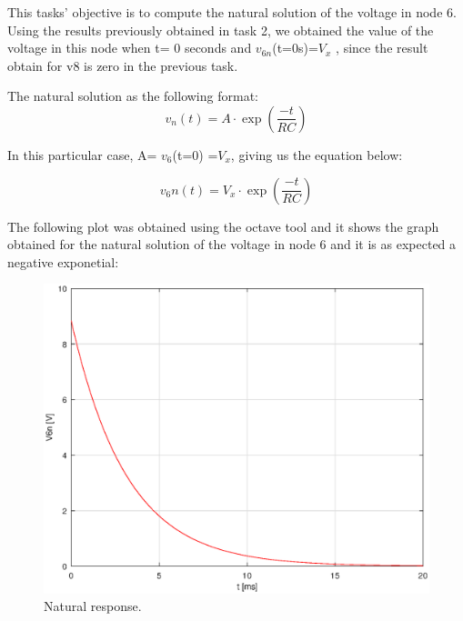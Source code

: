 This tasks' objective is to compute the natural solution of the voltage in node 6. Using the results previously obtained in task 2, we  obtained the value of the voltage in this node when t= 0 seconds and $v_{6n}$(t=0s)=$V_x$ , since the result obtain for v8 is zero in the previous task.

\par The natural solution as the following format:
\begin{equation}
v_n(t) = A \cdot \exp(\frac{-t}{RC})
\end{equation}

In this particular case, A= $v_6$(t=0) =$V_x$, giving us the equation below:

\begin{equation}
v_6n(t) = V_x \cdot \exp(\frac{-t}{RC})
\end{equation}

The following plot was obtained using the octave tool and it shows the graph obtained for the natural solution of the voltage in node 6 and it is as expected a negative exponetial:
\begin{figure}[H] \centering
\includegraphics[width=0.6\linewidth]{theoretical.eps}
\caption{Natural response.}
\label{fig:point3}
\end{figure}

